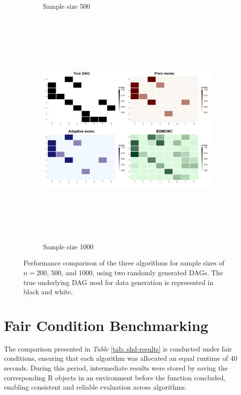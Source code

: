 \documentclass{report}
\begin{document}
\begin{figure}[!ht]
{\begin{minipage}{\textwidth}
\begin{subfigure}[b]{0.45\textwidth}
				\caption{Sample size 500}
				\label{fig:heatmaps-500}
			\end{subfigure}
			\hspace{0.35cm}
			\begin{subfigure}[b]{0.45\textwidth}   
				\centering
				\includegraphics[width=\textwidth, height=12cm]{Figures/Overall_comparison/Random_dags/heat_dag_4_n_1000.png}
				\caption{Sample size 1000}
				\label{fig:heatmaps-500}
			\end{subfigure}
		\end{minipage}
	}
	\caption{Performance comparison of the three algorithms for sample sizes of $n = 200$, $500$, and $1000$, using two randomly generated DAGs. The true underlying DAG used for data generation is represented in black and white.}
	\label{fig: two-three-dags}
\end{figure}

\section{Fair Condition Benchmarking}

The comparison presented in \textit{Table} \ref{tab: shd-results} is conducted under fair conditions, ensuring that each algorithm was allocated an equal runtime of 40 seconds. During this period, intermediate results were stored by saving the corresponding R objects in an environment before the function concluded, enabling consistent and reliable evaluation across algorithms.
\end{document}
